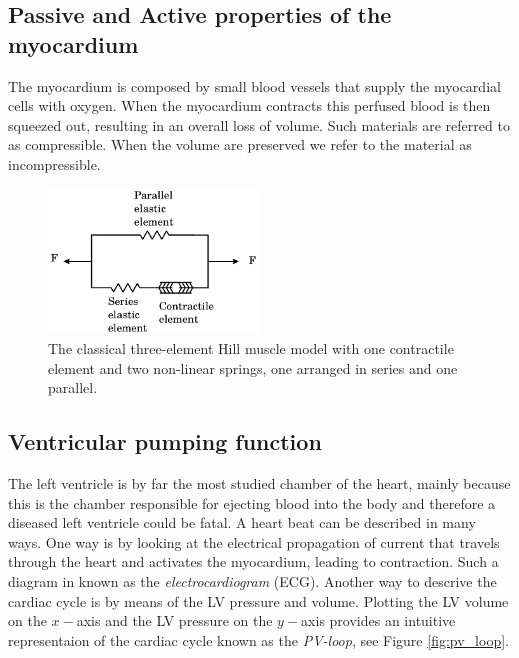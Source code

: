 \subsection{Passive and Active properties of the myocardium}
The myocardium is composed by small blood vessels that supply the
myocardial cells with oxygen. When the myocardium contracts this
perfused blood is then squeezed out, resulting in an overall loss of
volume. Such materials are referred to as compressible. When the
volume are preserved we refer to the material as incompressible.



\begin{figure}[htbp]
  \centering
    \includegraphics[width=0.5\textwidth]{chapters/introduction/figures/Hill_muscle_model.pdf}
\caption{The classical three-element Hill muscle model with one
  contractile element and two non-linear springs, one arranged in
  series and one parallel. }
\label{fig:hill_muscle_model}
\end{figure}



\subsection{Ventricular pumping function}
\label{sec:ventricular_pumping_function}
The left ventricle is by far the most studied chamber of the heart,
mainly because this is the chamber responsible for ejecting blood into the
body and therefore a diseased left ventricle could be fatal. A heart
beat can be described in many ways. One way is by looking at the
electrical propagation of current that travels through the heart and
activates the myocardium, leading to contraction. Such a diagram in
known as the \emph{electrocardiogram} (ECG). Another way to descrive
the cardiac cycle is by means of the LV pressure and volume. Plotting
the LV volume on the $x-$axis and the LV pressure on the $y-$axis
provides an intuitive representaion of the cardiac cycle known as the
\emph{PV-loop}, see Figure \ref{fig:pv_loop}.



